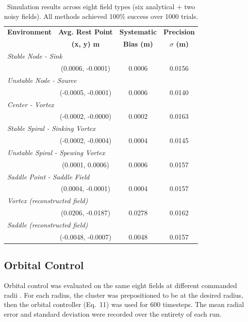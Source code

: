 \documentclass[lettersize,journal]{IEEEtran}
\begin{document}
\begin{table}[!t]
\footnotesize
\centering
\caption{Simulation results across eight field types (six analytical + two noisy fields). All methods achieved 100\% success over 1000 trials.}
\label{tab:simulation_estimation_results}
\setlength{\tabcolsep}{4pt}
\begin{tabular}{lccc}
\hline
\textbf{Environment} & \textbf{Avg. Rest Point} & \textbf{Systematic} & \textbf{Precision} \\
 & \textbf{(x, y) m} & \textbf{Bias (m)} & \textbf{$\sigma$ (m)} \\
\hline
\multicolumn{4}{l}{\textit{Stable Node - Sink}} \\
\hline
 & (0.0006, -0.0001) & 0.0006 & 0.0156 \\
\hline
\multicolumn{4}{l}{\textit{Unstable Node - Source}} \\
\hline
 & (-0.0005, -0.0001) & 0.0006 & 0.0140 \\
\hline
\multicolumn{4}{l}{\textit{Center - Vortex}} \\
\hline
 & (-0.0002, -0.0000) & 0.0002 & 0.0163 \\
\hline
\multicolumn{4}{l}{\textit{Stable Spiral - Sinking Vortex}} \\
\hline
 & (-0.0002, -0.0004) & 0.0004 & 0.0145 \\
\hline
\multicolumn{4}{l}{\textit{Unstable Spiral - Spewing Vortex}} \\
\hline
 & (0.0001, 0.0006) & 0.0006 & 0.0157 \\
\hline
\multicolumn{4}{l}{\textit{Saddle Point - Saddle Field}} \\
\hline
 & (0.0004, -0.0001) & 0.0004 & 0.0157 \\
\hline
\multicolumn{4}{l}{\textit{Vortex (reconstructed field)}} \\
\hline
 & (0.0206, -0.0187) & 0.0278 & 0.0162 \\
\hline
\multicolumn{4}{l}{\textit{Saddle (reconstructed field)}} \\
\hline
 & (-0.0048, -0.0007) & 0.0048 & 0.0157 \\
\hline
\end{tabular}
\end{table}


\subsection{Orbital Control}

Orbital control was evaluated on the same eight fields at different commanded radii . For each radius, the cluster was prepositioned to be at the desired radius, then the orbital controller (Eq.~11) was used for 600 timesteps. The mean radial error and standard deviation were recorded over the entirety of each
run.
\end{document}

